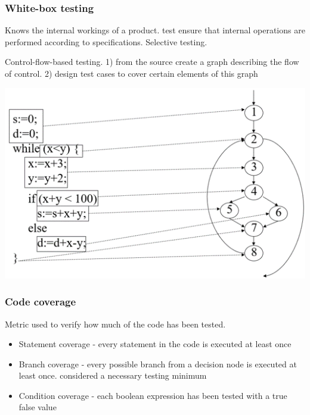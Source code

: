 \documentclass{article}
\begin{document}
    \subsubsection*{White-box testing}

    Knows the internal workings of a product. test ensure that internal operations are 
    performed according to specifications. Selective testing.

    Control-flow-based testing. 1) from the source create a graph describing the flow of 
    control. 2) design test cases to cover certain elements of this graph 
    
    \begin{center}
        \includegraphics[scale=0.6]{control-flow-graph.png}
    \end{center}

    \subsubsection*{Code coverage}

    Metric used to verify how much of the code has been tested.
    
    \begin{itemize}
        \item Statement coverage - every statement in the code is executed at least once 
        \item Branch coverage - every possible branch from a decision node is 
        executed at least once. considered a necessary testing minimum
        \item Condition coverage - each boolean expression has been tested with a true 
        false value
    \end{itemize}
\end{document}
